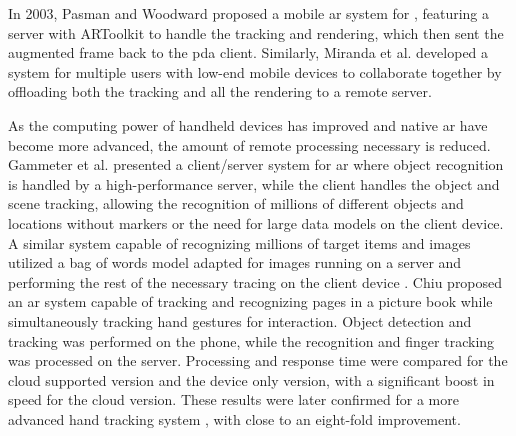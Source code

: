 \documentclass[thesis]{fputhesis}
\begin{document}
\begin{body}
In 2003, Pasman and Woodward \cite{pasman_implementation_2003} proposed a mobile \acrshort{ar} system for , featuring a server with ARToolkit to handle the tracking and rendering, which then sent the augmented frame back to the \acrshort{pda} client. Similarly, Miranda et al. \cite{miranda_low-cost_2021} developed a system for multiple users with low-end mobile devices to collaborate together by offloading both the tracking and all the rendering to a remote server.  

As the computing power of handheld devices has improved and native \acrshort{ar}  have become more advanced, the amount of remote processing necessary is reduced. Gammeter et al. \cite{gammeter_server-side_2010} presented a client/server system for \acrshort{ar} where object recognition is handled by a high-performance server, while the client handles the object and scene tracking, allowing the recognition of millions of different objects and locations without markers or the need for large data models on the client device. A similar system capable of recognizing millions of target items and images utilized a bag of words model adapted for images running on a server and performing the rest of the necessary tracing on the client device \cite{ha_real-time_2011}. Chiu \cite{chiu_cloud_2014} proposed an \acrshort{ar} system capable of tracking and recognizing pages in a picture book while simultaneously tracking hand gestures for interaction. Object detection and tracking was performed on the phone, while the recognition and finger tracking was processed on the server. Processing and response time were compared for the cloud supported version and the device only version, with a significant boost in speed for the cloud version. These results were later confirmed for a more advanced hand tracking system \cite{chiu_interactive_2018}, with close to an eight-fold improvement.


\end{body}
\end{document}
